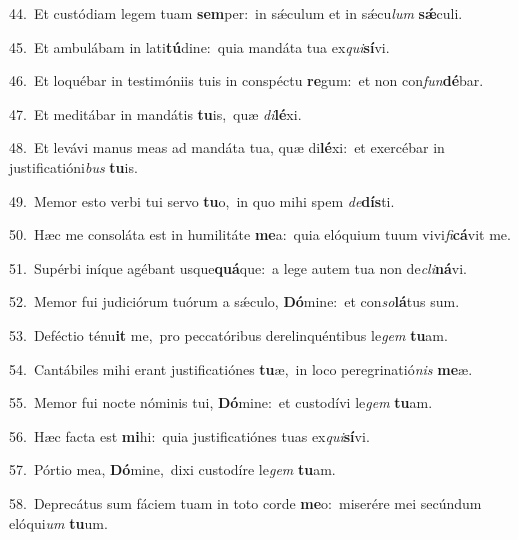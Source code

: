 {\numbfont\textcolor{\numbcolor}{44.}}~Et custódiam legem tuam \textbf{sem}\-per:~\star in sǽculum et in sǽcu\textit{lum} \textbf{sǽ}\-culi.\par
{\numbfont\textcolor{\numbcolor}{45.}}~Et ambulábam in lati\-\textbf{tú}\-dine:~\star quia mandáta tua ex\-\textit{qui}\-\textbf{sí}vi.\par
{\numbfont\textcolor{\numbcolor}{46.}}~Et loquébar in testimóniis tuis in conspéctu \textbf{re}\-gum:~\star et non con\-\textit{fun}\-\textbf{dé}bar.\par
{\numbfont\textcolor{\numbcolor}{47.}}~Et meditábar in mandátis \textbf{tu}\-is,~\star quæ \textit{di}\-\textbf{lé}xi.\par
{\numbfont\textcolor{\numbcolor}{48.}}~Et levávi manus meas ad mandáta tua, quæ di\-\textbf{lé}\-xi:~\star et exercébar in justificatióni\textit{bus} \textbf{tu}\-is.\par
{\numbfont\textcolor{\numbcolor}{49.}}~Memor esto verbi tui servo \textbf{tu}\-o,~\star in quo mihi spem \textit{de}\-\textbf{dís}ti.\par
{\numbfont\textcolor{\numbcolor}{50.}}~Hæc me consoláta est in humilitáte \textbf{me}\-a:~\star quia elóquium tuum vivi\-\textit{fi}\-\textbf{cá}vit me.\par
{\numbfont\textcolor{\numbcolor}{51.}}~Supérbi iníque agébant usque\-\textbf{quá}\-que:~\star a lege autem tua non de\-\textit{cli}\-\textbf{ná}vi.\par
{\numbfont\textcolor{\numbcolor}{52.}}~Memor fui judiciórum tuórum a sǽculo, \textbf{Dó}\-mine:~\star et con\-\textit{so}\-\textbf{lá}tus sum.\par
{\numbfont\textcolor{\numbcolor}{53.}}~Deféctio ténu\textbf{it} me,~\star pro peccatóribus derelinquéntibus le\textit{gem} \textbf{tu}\-am.\par
{\numbfont\textcolor{\numbcolor}{54.}}~Cantábiles mihi erant justificatiónes \textbf{tu}\-æ,~\star in loco peregrinatió\textit{nis} \textbf{me}\-æ.\par
{\numbfont\textcolor{\numbcolor}{55.}}~Memor fui nocte nóminis tui, \textbf{Dó}\-mine:~\star et custodívi le\textit{gem} \textbf{tu}\-am.\par
{\numbfont\textcolor{\numbcolor}{56.}}~Hæc facta est \textbf{mi}\-hi:~\star quia justificatiónes tuas ex\-\textit{qui}\-\textbf{sí}vi.\par
{\numbfont\textcolor{\numbcolor}{57.}}~Pórtio mea, \textbf{Dó}\-mine,~\star dixi custodíre le\textit{gem} \textbf{tu}\-am.\par
{\numbfont\textcolor{\numbcolor}{58.}}~Deprecátus sum fáciem tuam in toto corde \textbf{me}\-o:~\star miserére mei secúndum elóqui\textit{um} \textbf{tu}\-um.\par
